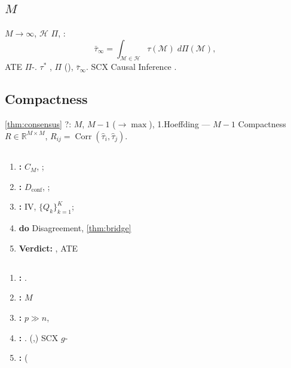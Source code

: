 \documentclass[11pt,a4paper,twoside]{article}
\DeclareMathOperator{\Corr}{Corr}
\begin{document}
\section{}
\label{sec:discussion}
\subsection{ $M$}
 $M \to \infty$,  $\mathscr{H}$ 
 $\Pi$, : 
\[
\bar{\tau}_\infty = \int_{\mathcal{M} \in \mathscr{H}} \tau(\mathcal{M}) \; d\Pi(\mathcal{M}),
\]
 ATE $\Pi$-.\textbf{ $\tau^*$}
, $\Pi$ (), 
 $\bar{\tau}_\infty$.
 SCX Causal Inference \citep{li2018bayesian}.
\subsection{Compactness}
 \ref{thm:consensus} ?: 
$M$, $M-1$ ($\to \max$), 
 1.Hoeffding --- $M-1$ 
Compactness $R \in \mathbb{R}^{M \times M}$, 
 $R_{ij} = \Corr(\hat{\tau}_i, \hat{\tau}_j)$.
\subsection{}
\begin{enumerate}[label= \arabic*,leftmargin=*]
 \item \textbf{: } $C_M$, ; 
 \item \textbf{: } $D_{\text{conf}}$, ; 
 \item \textbf{: } IV, $\{Q_k\}_{k=1}^{K}$; 
 \item \textbf{do} Disagreement, \ref{thm:bridge}
 \item \textbf{Verdict: }, ATE 
\end{enumerate}
\subsection{}
\begin{enumerate}[label=(\arabic*),leftmargin=*]
 \item \textbf{: }.
 \item \textbf{: } $M$ 
 \item \textbf{: } $p \gg n$, 
 \item \textbf{: }.
 (,) SCX $g$-
 \item \textbf{: } (
\end{enumerate}
\end{document}
